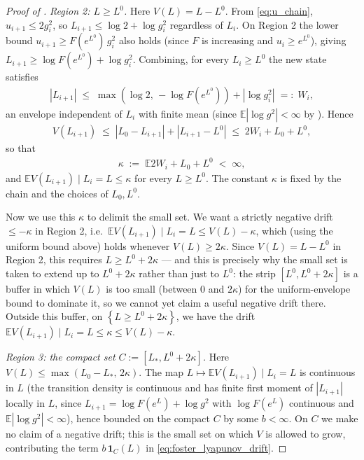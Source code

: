 \documentclass{article}
\newcommand{\Abs}[1]{\left| #1 \right|}
\newcommand{\Set}[1]{\left\{ #1 \right\}}
\newcommand{\Brack}[1]{\left( #1 \right)}
\newcommand{\Exp}[1]{\mathbb{E} #1}
\newcommand{\cond}{\mid}
\begin{document}
\begin{proof}[Proof of ]
  \emph{Region 2: $L \ge L^0$.} Here $V(L) = L - L^0$. From \eqref{eq:u_chain}, $u_{i+1} \le 2 g_i^2$, so $L_{i+1} \le \log 2 + \log g_i^2$ regardless of $L_i$. On Region 2 the lower bound $u_{i+1} \ge F(e^{L^0})\, g_i^2$ also holds (since $F$ is increasing and $u_i \ge e^{L^0}$), giving $L_{i+1} \ge \log F(e^{L^0}) + \log g_i^2$. Combining, for every $L_i \ge L^0$ the new state satisfies
  \begin{eqnarray*}
    \Abs{L_{i+1}} \;\le\; \max\!\Brack{\log 2,\, -\log F(e^{L^0})} + \Abs{\log g_i^2}
    \;=:\; W_i,
  \end{eqnarray*}
  an envelope independent of $L_i$ with finite mean (since $\Exp{|\log g^2|} < \infty$ by ). Hence
  \begin{eqnarray*}
    V(L_{i+1}) \;\le\; \Abs{L_0 - L_{i+1}} + \Abs{L_{i+1} - L^0} \;\le\; 2 W_i + L_0 + L^0,
  \end{eqnarray*}
  so that
  \begin{eqnarray*}
    \kappa \;:=\; \Exp{2 W_i + L_0 + L^0} \;<\; \infty,
  \end{eqnarray*}
  and $\Exp{V(L_{i+1}) \cond L_i = L} \le \kappa$ for every $L \ge L^0$. The constant $\kappa$ is fixed by the chain and the choices of $L_0, L^0$.

  Now we use this $\kappa$ to delimit the small set. We want a strictly negative drift $\le -\kappa$ in Region 2, i.e.\ $\Exp{V(L_{i+1}) \cond L_i = L} \le V(L) - \kappa$, which (using the uniform bound above) holds whenever $V(L) \ge 2\kappa$. Since $V(L) = L - L^0$ in Region 2, this requires $L \ge L^0 + 2\kappa$ --- and this is precisely why the small set is taken to extend up to $L^0 + 2\kappa$ rather than just to $L^0$: the strip $[L^0, L^0 + 2\kappa]$ is a buffer in which $V(L)$ is too small (between $0$ and $2\kappa$) for the uniform-envelope bound to dominate it, so we cannot yet claim a useful negative drift there. Outside this buffer, on $\Set{L \ge L^0 + 2\kappa}$, we have the drift $\Exp{V(L_{i+1}) \cond L_i = L} \le \kappa \le V(L) - \kappa$.

  \emph{Region 3: the compact set $C := [L_*, L^0 + 2\kappa]$.} Here $V(L) \le \max(L_0 - L_*,\, 2\kappa)$. The map $L \mapsto \Exp{V(L_{i+1}) \cond L_i = L}$ is continuous in $L$ (the transition density is continuous and has finite first moment of $|L_{i+1}|$ locally in $L$, since $L_{i+1} = \log F(e^L) + \log g^2$ with $\log F(e^L)$ continuous and $\Exp{|\log g^2|} < \infty$), hence bounded on the compact $C$ by some $b < \infty$. On $C$ we make no claim of a negative drift; this is the small set on which $V$ is allowed to grow, contributing the term $b\,\mathbf{1}_C(L)$ in \eqref{eq:foster_lyapunov_drift}.


\end{proof}
\end{document}
